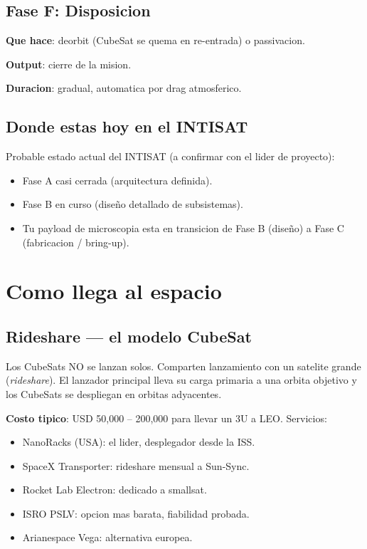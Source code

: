 \documentclass[11pt,a4paper,oneside,openright]{book}
\begin{document}
\section{Fase F: Disposicion}

\textbf{Que hace}: deorbit (CubeSat se quema en re-entrada) o passivacion.

\textbf{Output}: cierre de la mision.

\textbf{Duracion}: gradual, automatica por drag atmosferico.

\section{Donde estas hoy en el INTISAT}

\begin{payload}
Probable estado actual del INTISAT (a confirmar con el lider de proyecto):
\begin{itemize}[leftmargin=1em]
  \item Fase A casi cerrada (arquitectura definida).
  \item Fase B en curso (diseño detallado de subsistemas).
  \item Tu payload de microscopia esta en transicion de Fase B (diseño)
        a Fase C (fabricacion / bring-up).
\end{itemize}
\end{payload}

\chapter{Como llega al espacio}
\label{ch:lanzamiento}

\section{Rideshare --- el modelo CubeSat}

Los CubeSats NO se lanzan solos. Comparten lanzamiento con un satelite
grande (\emph{rideshare}). El lanzador principal lleva su carga primaria a
una orbita objetivo y los CubeSats se despliegan en orbitas adyacentes.

\textbf{Costo tipico}: USD 50,000 -- 200,000 para llevar un 3U a LEO.
Servicios:
\begin{itemize}[leftmargin=2em]
  \item NanoRacks (USA): el lider, desplegador desde la ISS.
  \item SpaceX Transporter: rideshare mensual a Sun-Sync.
  \item Rocket Lab Electron: dedicado a smallsat.
  \item ISRO PSLV: opcion mas barata, fiabilidad probada.
  \item Arianespace Vega: alternativa europea.
\end{itemize}
\end{document}
